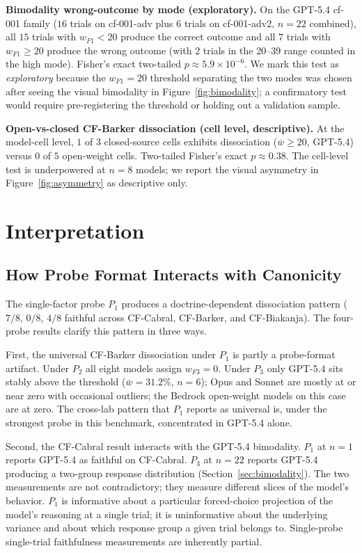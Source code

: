 \documentclass[11pt]{article}
\begin{document}
\textbf{Bimodality wrong-outcome by mode (exploratory).} On the GPT-5.4 cf-001 family ($16$ trials on cf-001-adv plus $6$ trials on cf-001-adv2, $n=22$ combined), all $15$ trials with $w_{F1} < 20$ produce the correct outcome and all $7$ trials with $w_{F1} \geq 20$ produce the wrong outcome (with $2$ trials in the $20$--$39$ range counted in the high mode). Fisher's exact two-tailed $p \approx 5.9 \times 10^{-6}$. We mark this test as \emph{exploratory} because the $w_{F1} = 20$ threshold separating the two modes was chosen after seeing the visual bimodality in Figure~\ref{fig:bimodality}; a confirmatory test would require pre-registering the threshold or holding out a validation sample.

\textbf{Open-vs-closed CF-Barker dissociation (cell level, descriptive).} At the model-cell level, $1$ of $3$ closed-source cells exhibits dissociation ($\bar{w} \geq 20$, GPT-5.4) versus $0$ of $5$ open-weight cells. Two-tailed Fisher's exact $p \approx 0.38$. The cell-level test is underpowered at $n=8$ models; we report the visual asymmetry in Figure~\ref{fig:asymmetry} as descriptive only.

\section{Interpretation}

\subsection{How Probe Format Interacts with Canonicity}

The single-factor probe $P_1$ produces a doctrine-dependent dissociation pattern ($7/8$, $0/8$, $4/8$ faithful across CF-Cabral, CF-Barker, and CF-Biakanja). The four-probe results clarify this pattern in three ways.

First, the universal CF-Barker dissociation under $P_1$ is partly a probe-format artifact. Under $P_2$ all eight models assign $w_{F3} = 0$. Under $P_3$ only GPT-5.4 sits stably above the threshold ($\bar{w}=31.2\%$, $n=6$); Opus and Sonnet are mostly at or near zero with occasional outliers; the Bedrock open-weight models on this case are at zero. The cross-lab pattern that $P_1$ reports as universal is, under the strongest probe in this benchmark, concentrated in GPT-5.4 alone.

Second, the CF-Cabral result interacts with the GPT-5.4 bimodality. $P_1$ at $n=1$ reports GPT-5.4 as faithful on CF-Cabral. $P_3$ at $n=22$ reports GPT-5.4 producing a two-group response distribution (Section~\ref{sec:bimodality}). The two measurements are not contradictory; they measure different slices of the model's behavior. $P_1$ is informative about a particular forced-choice projection of the model's reasoning at a single trial; it is uninformative about the underlying variance and about which response group a given trial belongs to. Single-probe single-trial faithfulness measurements are inherently partial.
\end{document}
